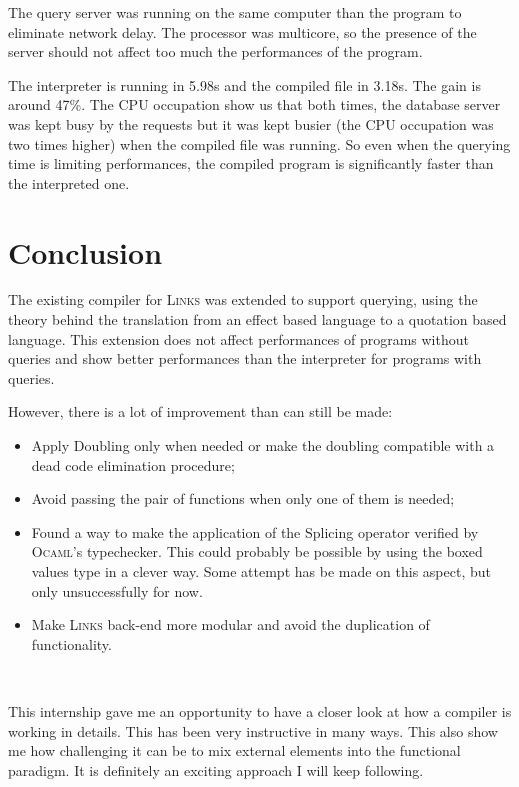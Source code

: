 \documentclass[11pt]{article}
\newcommand\mysc[1]{{\rmfamily\textsc{#1}}\xspace}
\newcommand\links{\mysc{Links}}
\newcommand\ocaml{\mysc{Ocaml}}
\begin{document}
The query server was running on the same computer than the program to eliminate network delay. The processor was multicore, so the presence of the server should not affect too much the performances of the program.

The interpreter is running in 5.98s and the compiled file in 3.18s. The gain is around 47\%. The CPU occupation show us that both times, the database server was kept busy by the requests but it was kept busier (the CPU occupation was two times higher) when the compiled file was running. So even when the querying time is limiting performances, the compiled program is significantly faster than the interpreted one. 

\section{Conclusion}

The existing compiler for \links was extended to support querying, using the theory behind the translation from an effect based language to a quotation based language. This extension does not affect performances of programs without queries and show better performances than the interpreter for programs with queries.

However, there is a lot of improvement than can still be made:
\begin{itemize}
\item Apply Doubling only when needed or make the doubling compatible with a dead code elimination procedure;
\item Avoid passing the pair of functions when only one of them is needed;
\item Found a way to make the application of the Splicing operator verified by \ocaml's typechecker. This could probably be possible by using the boxed values type in a clever way. Some attempt has be made on this aspect, but only unsuccessfully for now.
\item Make \links back-end more modular and avoid the duplication of functionality.
\end{itemize}\ 

This internship gave me an opportunity to have a closer look at how a compiler is working in details. This has been very instructive in many ways. This also show me how challenging it can be to mix external elements into the functional paradigm. It is definitely an exciting approach I will keep following.



\newpage
\end{document}
